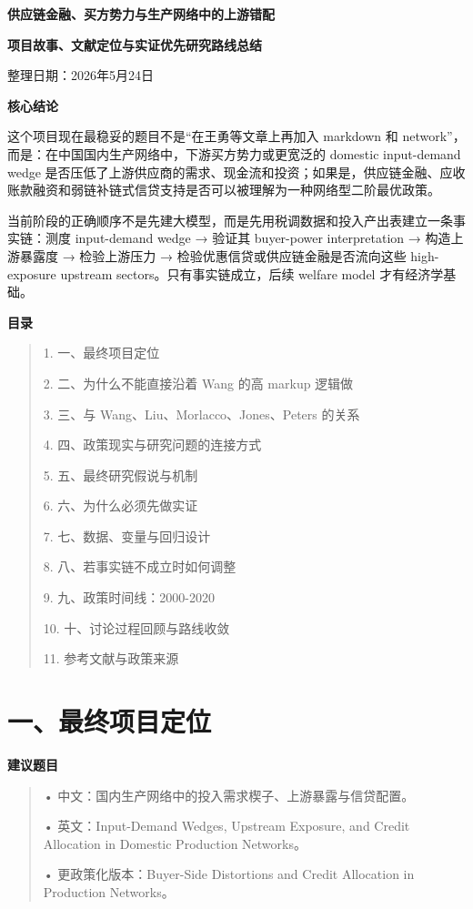 \documentclass[
  12pt,
]{ctexart}
\author{}
\date{}
\begin{document}
\textbf{供应链金融、买方势力与生产网络中的上游错配}

\textbf{项目故事、文献定位与实证优先研究路线总结}

整理日期：2026年5月24日

\textbf{核心结论}

这个项目现在最稳妥的题目不是``在王勇等文章上再加入 markdown 和 network''，而是：在中国国内生产网络中，下游买方势力或更宽泛的 domestic input-demand wedge 是否压低了上游供应商的需求、现金流和投资；如果是，供应链金融、应收账款融资和弱链补链式信贷支持是否可以被理解为一种网络型二阶最优政策。

当前阶段的正确顺序不是先建大模型，而是先用税调数据和投入产出表建立一条事实链：测度 input-demand wedge → 验证其 buyer-power interpretation → 构造上游暴露度 → 检验上游压力 → 检验优惠信贷或供应链金融是否流向这些 high-exposure upstream sectors。只有事实链成立，后续 welfare model 才有经济学基础。

\textbf{目录}

\begin{quote}
1. 一、最终项目定位

2. 二、为什么不能直接沿着 Wang 的高 markup 逻辑做

3. 三、与 Wang、Liu、Morlacco、Jones、Peters 的关系

4. 四、政策现实与研究问题的连接方式

5. 五、最终研究假说与机制

6. 六、为什么必须先做实证

7. 七、数据、变量与回归设计

8. 八、若事实链不成立时如何调整

9. 九、政策时间线：2000-2020

10. 十、讨论过程回顾与路线收敛

11. 参考文献与政策来源
\end{quote}

\section{一、最终项目定位}\label{ux4e00ux6700ux7ec8ux9879ux76eeux5b9aux4f4d}

\textbf{建议题目}

\begin{quote}
• 中文：国内生产网络中的投入需求楔子、上游暴露与信贷配置。

• 英文：Input-Demand Wedges, Upstream Exposure, and Credit Allocation in Domestic Production Networks。

• 更政策化版本：Buyer-Side Distortions and Credit Allocation in Production Networks。
\end{quote}
\end{document}
